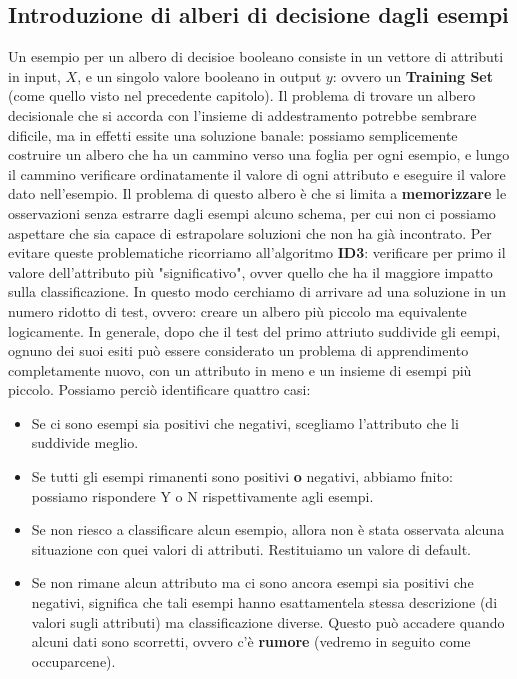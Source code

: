 \subsection{Introduzione di alberi di decisione dagli esempi}
Un esempio per un albero di decisioe booleano consiste in un vettore di attributi in input, $X$, e un singolo valore booleano in output $y$: ovvero un \textbf{Training Set} (come quello visto nel precedente capitolo).
Il problema di trovare un albero decisionale che si accorda con l'insieme di addestramento potrebbe sembrare dificile, ma in effetti essite una soluzione banale: possiamo semplicemente costruire un albero che ha un cammino verso una foglia per ogni esempio, e lungo il cammino verificare ordinatamente il valore di ogni attributo e eseguire il valore dato nell'esempio. Il problema di questo albero è che si limita a \textbf{memorizzare} le osservazioni senza estrarre dagli esempi alcuno schema, per cui non ci possiamo aspettare che sia capace di estrapolare soluzioni che non ha già incontrato. Per evitare queste problematiche ricorriamo all'algoritmo \textbf{ID3}: verificare per primo il valore dell'attributo più "significativo", ovver quello che ha il maggiore impatto sulla classificazione. In questo modo cerchiamo di arrivare ad una soluzione in un numero ridotto di test, ovvero: creare un albero più piccolo ma equivalente logicamente. In generale, dopo che il test del primo attriuto suddivide gli eempi, ognuno dei suoi esiti può essere considerato un problema di apprendimento completamente nuovo, con un attributo in meno e un insieme di esempi più piccolo. Possiamo perciò identificare quattro casi:
\begin{itemize}
    \item Se ci sono esempi sia positivi che negativi, scegliamo l'attributo che li suddivide meglio.
    \item Se tutti gli esempi rimanenti sono positivi \textbf{o} negativi, abbiamo fnito: possiamo rispondere Y o N rispettivamente agli esempi.
    \item Se non riesco a classificare alcun esempio, allora non è stata osservata alcuna situazione con quei valori di attributi. Restituiamo un valore di default.
    \item Se non rimane alcun attributo ma ci sono ancora esempi sia positivi che negativi, significa che tali esempi hanno esattamentela stessa descrizione (di valori sugli attributi) ma classificazione diverse. Questo può accadere quando alcuni dati sono scorretti, ovvero c'è \textbf{rumore} (vedremo in seguito come occuparcene).
\end{itemize}
